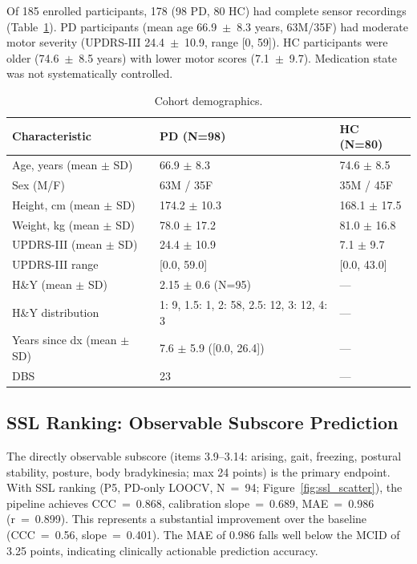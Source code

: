 \documentclass[11pt]{article}
\begin{document}
Of 185 enrolled participants, 178 (98 PD, 80 HC) had complete sensor recordings (Table~\ref{tab:demographics}). PD participants (mean age 66.9~$\pm$~8.3 years, 63M/35F) had moderate motor severity (UPDRS-III 24.4~$\pm$~10.9, range [0, 59]). HC participants were older (74.6~$\pm$~8.5 years) with lower motor scores (7.1~$\pm$~9.7). Medication state was not systematically controlled.
\begin{table}[H]
\centering
\caption{Cohort demographics.}
\label{tab:demographics}
\begin{tabular}{lll}
\toprule
Characteristic & PD (N=98) & HC (N=80) \\
\midrule
Age, years (mean $\pm$ SD) & 66.9 $\pm$ 8.3 & 74.6 $\pm$ 8.5 \\
Sex (M/F) & 63M / 35F & 35M / 45F \\
Height, cm (mean $\pm$ SD) & 174.2 $\pm$ 10.3 & 168.1 $\pm$ 17.5 \\
Weight, kg (mean $\pm$ SD) & 78.0 $\pm$ 17.2 & 81.0 $\pm$ 16.8 \\
UPDRS-III (mean $\pm$ SD) & 24.4 $\pm$ 10.9 & 7.1 $\pm$ 9.7 \\
UPDRS-III range & [0.0, 59.0] & [0.0, 43.0] \\
H\&Y (mean $\pm$ SD) & 2.15 $\pm$ 0.6 (N=95) & --- \\
H\&Y distribution & 1: 9, 1.5: 1, 2: 58, 2.5: 12, 3: 12, 4: 3 & --- \\
Years since dx (mean $\pm$ SD) & 7.6 $\pm$ 5.9 ([0.0, 26.4]) & --- \\
DBS & 23 & --- \\
\bottomrule
\end{tabular}
\end{table}

\subsection{SSL Ranking: Observable Subscore Prediction}

The directly observable subscore (items 3.9--3.14: arising, gait, freezing, postural stability, posture, body bradykinesia; max 24 points) is the primary endpoint. With SSL ranking (P5, PD-only LOOCV, N~=~94; Figure~\ref{fig:ssl_scatter}), the pipeline achieves CCC~=~0.868, calibration slope~=~0.689, MAE~=~0.986 (r~=~0.899). This represents a substantial improvement over the baseline (CCC~=~0.56, slope~=~0.401). The MAE of 0.986 falls well below the MCID of 3.25 points, indicating clinically actionable prediction accuracy.
\end{document}
